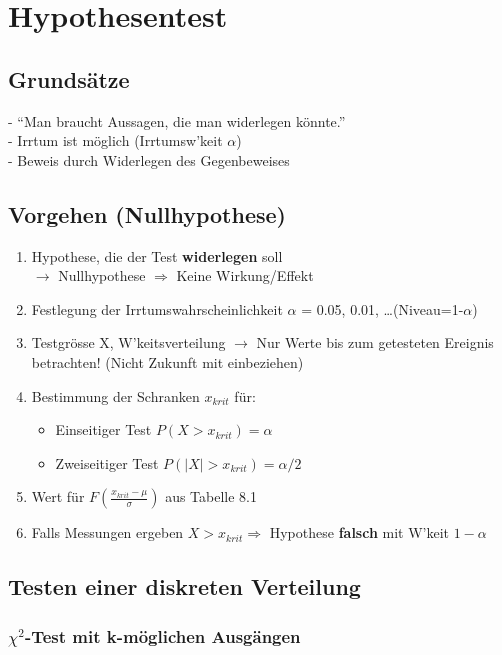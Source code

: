 \section{Hypothesentest }
	\subsection{Grundsätze}
	- ``Man braucht Aussagen, die man widerlegen könnte.''\\
	- Irrtum ist möglich (Irrtumsw'keit $\alpha$)\\
	- Beweis durch Widerlegen des Gegenbeweises
	\subsection{Vorgehen (Nullhypothese)}
	\begin{enumerate}
      \item Hypothese, die der Test \textbf{widerlegen} soll\\
      	$\rightarrow$ Nullhypothese $\Rightarrow$ Keine Wirkung/Effekt
      \item Festlegung der Irrtumswahrscheinlichkeit 	$\alpha$ = 0.05, 0.01, \ldots (Niveau=1-$\alpha$)
      \item Testgrösse X, W'keitsverteilung
      	$\rightarrow$ Nur Werte bis zum getesteten Ereignis betrachten! (Nicht Zukunft mit einbeziehen)
      \item Bestimmung der Schranken $x_{krit}$ für: 		
      	\begin{itemize}
      		\item Einseitiger Test $P(X > x_{krit})=\alpha$
      		\item Zweiseitiger Test $P(|X| > x_{krit})=\alpha/2$
      	\end{itemize}
      \item Wert für $F\!\left({\frac{x_{krit}-\mu}{\sigma}}\right)$ aus Tabelle 8.1
      \item Falls Messungen ergeben $X > x_{krit} \Longrightarrow$ Hypothese
      \textbf{falsch} mit W'keit $1-\alpha$
    \end{enumerate}
    
    
	\subsection{Testen einer diskreten Verteilung
	}
	\subsubsection{$\chi^2$-Test mit k-möglichen Ausgängen}
		
